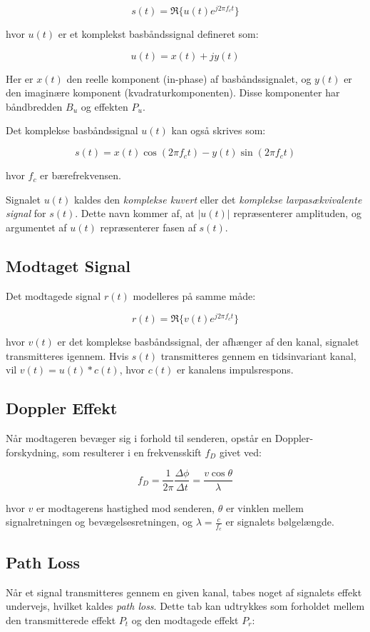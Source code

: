 \documentclass[a4paper,12pt]{book}
\begin{document}
	\[
	s(t) = \Re \{ u(t) e^{j2\pi f_c t} \}
	\]
	
	\noindent hvor \( u(t) \) er et komplekst basbåndssignal defineret som:
	
	\[
	u(t) = x(t) + jy(t)
	\]
	
	\noindent Her er \( x(t) \) den reelle komponent (in-phase) af basbåndssignalet, og \( y(t) \) er den imaginære komponent (kvadraturkomponenten). Disse komponenter har båndbredden \( B_u \) og effekten \( P_u \).
	
	\noindent Det komplekse basbåndssignal \( u(t) \) kan også skrives som:
	
	\[
	s(t) = x(t) \cos(2\pi f_c t) - y(t) \sin(2\pi f_c t)
	\]
	
	\noindent hvor \( f_c \) er bærefrekvensen.
	
	\noindent Signalet \( u(t) \) kaldes den \textit{komplekse kuvert} eller det \textit{komplekse lavpasækvivalente signal} for \( s(t) \). Dette navn kommer af, at \( |u(t)| \) repræsenterer amplituden, og argumentet af \( u(t) \) repræsenterer fasen af \( s(t) \).
	
	\subsection{Modtaget Signal}
	Det modtagede signal \( r(t) \) modelleres på samme måde:
	
	\[
	r(t) = \Re \{ v(t) e^{j2\pi f_c t} \}
	\]
	
	\noindent hvor \( v(t) \) er det komplekse basbåndssignal, der afhænger af den kanal, signalet transmitteres igennem. Hvis \( s(t) \) transmitteres gennem en tidsinvariant kanal, vil \( v(t) = u(t) * c(t) \), hvor \( c(t) \) er kanalens impulsrespons.
	
	\subsection{Doppler Effekt}
	Når modtageren bevæger sig i forhold til senderen, opstår en Doppler-forskydning, som resulterer i en frekvensskift \( f_D \) givet ved:
	
	\[
	f_D = \frac{1}{2\pi} \frac{\Delta \phi}{\Delta t} = \frac{v \cos \theta}{\lambda}
	\]
	
	\noindent hvor \( v \) er modtagerens hastighed mod senderen, \( \theta \) er vinklen mellem signalretningen og bevægelsesretningen, og \( \lambda = \frac{c}{f_c} \) er signalets bølgelængde.
	
	\subsection{Path Loss}
	Når et signal transmitteres gennem en given kanal, tabes noget af signalets effekt undervejs, hvilket kaldes \textit{path loss}. Dette tab kan udtrykkes som forholdet mellem den transmitterede effekt \( P_t \) og den modtagede effekt \( P_r \):
	
\end{document}
